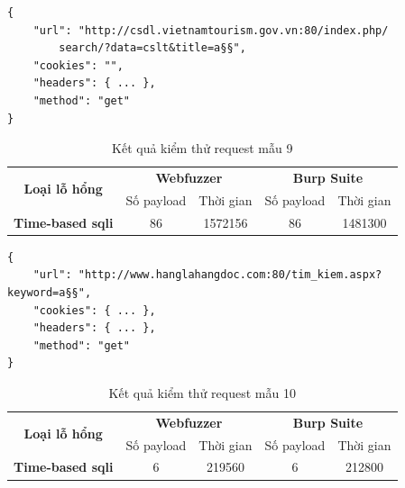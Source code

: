 \FloatBarrier
\begin{lstlisting}[style=ES6, label={lst:base-request-9}, caption={Request mẫu 9 có lỗ hổng time-based \acrshort{sqli}}]
{
    "url": "http://csdl.vietnamtourism.gov.vn:80/index.php/
        search/?data=cslt&title=a§§",
    "cookies": "",
    "headers": { ... },
    "method": "get"
}
\end{lstlisting}
\FloatBarrier
\begin{table}[ht]
    \centering
    \caption{Kết quả kiểm thử request mẫu 9}
    \label{tab:testing-result-9}
    \begin{tabular}[ht]{ccccc}
        \toprule[1pt]\midrule[0.3pt]
            \multirow{2}{*}{\textbf{Loại lỗ hổng}}&\multicolumn{2}{c}{\textbf{Webfuzzer}}&\multicolumn{2}{c}{\textbf{Burp Suite}}\\
            \cmidrule(lr){2-3}\cmidrule(lr){4-5}{}&Số payload&Thời gian&Số payload&Thời gian\\
        \midrule[0.3pt]
            \textbf{Time-based \acrshort{sqli}}&86&1572156&86&1481300\\
        \midrule[0.3pt]\bottomrule[1pt]
    \end{tabular}
\end{table}
\FloatBarrier
\begin{lstlisting}[style=ES6, label={lst:base-request-10}, caption={Request mẫu 10 có lỗ hổng time-based \acrshort{sqli}}]
{
    "url": "http://www.hanglahangdoc.com:80/tim_kiem.aspx?keyword=a§§",
    "cookies": { ... },
    "headers": { ... },
    "method": "get"
}
\end{lstlisting}
\FloatBarrier
\begin{table}[ht]
    \centering
    \caption{Kết quả kiểm thử request mẫu 10}
    \label{tab:testing-result-10}
    \begin{tabular}[ht]{ccccc}
        \toprule[1pt]\midrule[0.3pt]
            \multirow{2}{*}{\textbf{Loại lỗ hổng}}&\multicolumn{2}{c}{\textbf{Webfuzzer}}&\multicolumn{2}{c}{\textbf{Burp Suite}}\\
            \cmidrule(lr){2-3}\cmidrule(lr){4-5}{}&Số payload&Thời gian&Số payload&Thời gian\\
        \midrule[0.3pt]
            \textbf{Time-based \acrshort{sqli}}&6&219560&6&212800\\
        \midrule[0.3pt]\bottomrule[1pt]
    \end{tabular}
\end{table}
\FloatBarrier
